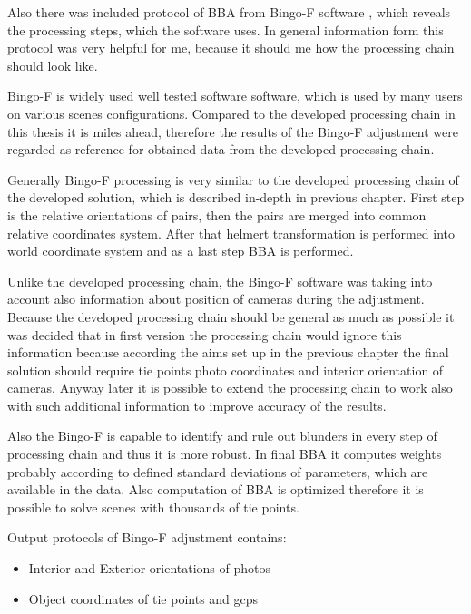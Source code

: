 \documentclass[a4paper,12pt]{report}
\begin{document}
Also there was included protocol of BBA from Bingo-F software \cite{bingo2013gip}, which reveals 
the processing steps, which the software uses.
In general information form this protocol was very helpful for me, because 
 it should me how the processing chain should look like.

Bingo-F is widely used well tested software software, which is used by many users on various  scenes configurations.  
Compared to the developed processing chain in this thesis it is miles ahead, therefore the results of the Bingo-F adjustment were 
regarded as reference for obtained data from the developed processing chain.

Generally Bingo-F processing is very similar to the developed  processing chain of the developed solution, which is  
described in-depth in previous chapter. First step is the relative orientations of pairs, then the pairs are merged into common relative 
coordinates system. After that helmert transformation is performed into world coordinate system and as a last step BBA is performed.

Unlike the developed processing chain,  the Bingo-F software was taking into account also information about position of cameras during the adjustment. 
Because the developed processing chain should be general as much as possible it was decided that in first version  the processing chain would ignore this 
information because according the aims set up in the previous chapter the final solution should require tie points photo coordinates and interior 
orientation of cameras. Anyway later it is possible to extend the processing chain to work also with such additional information to improve accuracy 
of the results. 

Also the Bingo-F is capable to identify and rule out blunders in every step of processing chain and thus it is more robust. 
In final BBA it computes weights probably according to defined standard deviations of parameters, which are available in the data. Also computation 
of BBA is optimized therefore it is possible to solve scenes with thousands of tie points.

Output  protocols of Bingo-F adjustment contains: 

\begin{itemize}
\item Interior and Exterior orientations of photos
\item Object coordinates of tie points and gcps
\end{itemize}
\end{document}
